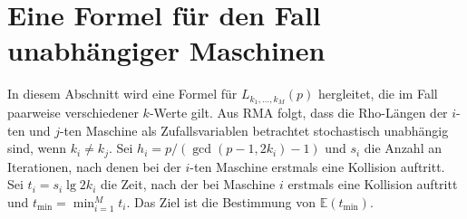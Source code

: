 \documentclass[a4paper, 10pt, ngerman]{article}
\newcommand{\E}{\mathbb{E}}
\begin{document}
\section{Eine Formel für den Fall unabhängiger Maschinen}

In diesem Abschnitt wird eine Formel für $L_{k_1, \dots, k_M}(p)$ hergleitet, die im Fall paarweise verschiedener $k$-Werte gilt. Aus RMA folgt, dass die Rho-Längen der $i$-ten und $j$-ten Maschine als Zufallsvariablen betrachtet stochastisch unabhängig sind, wenn $k_i \ne k_j$. Sei $h_i = p/(\gcd(p - 1, 2k_i) - 1)$ und $s_i$ die Anzahl an Iterationen, nach denen bei der $i$-ten Maschine erstmals eine Kollision auftritt. Sei $t_i = s_i \lg 2k_i$ die Zeit, nach der bei Maschine $i$ erstmals eine Kollision auftritt und $t_{\min} = \min_{i = 1}^M t_i$. Das Ziel ist die Bestimmung von $\E(t_{\min})$.
\end{document}
